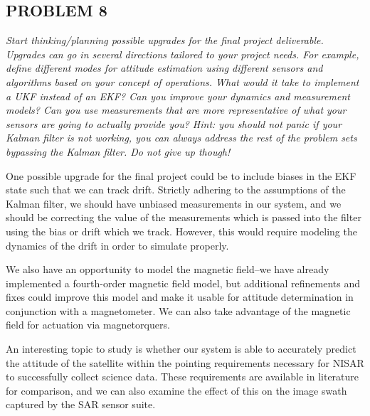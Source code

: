 \subsection{PROBLEM 8}
\textit{Start thinking/planning possible upgrades for the final project deliverable. Upgrades can go in several directions tailored to your project needs. For example, define different modes for attitude estimation using different sensors and algorithms based on your concept of operations. What would it take to implement a UKF instead of an EKF? Can you improve your dynamics and measurement models? Can you use measurements that are more representative of what your sensors are going to actually provide you? Hint: you should not panic if your Kalman filter is not working, you can always address the rest of the problem sets bypassing the Kalman filter. Do not give up though!}

One possible upgrade for the final project could be to include biases in the EKF state such that we can track drift. Strictly adhering to the assumptions of the Kalman filter, we should have unbiased measurements in our system, and we should be correcting the value of the measurements which is passed into the filter using the bias or drift which we track. However, this would require modeling the dynamics of the drift in order to simulate properly.

We also have an opportunity to model the magnetic field–we have already implemented a fourth-order magnetic field model, but additional refinements and fixes could improve this model and make it usable for attitude determination in conjunction with a magnetometer. We can also take advantage of the magnetic field for actuation via magnetorquers.

An interesting topic to study is whether our system is able to accurately predict the attitude of the satellite within the pointing requirements necessary for NISAR to successfully collect science data. These requirements are available in literature for comparison, and we can also examine the effect of this on the image swath captured by the SAR sensor suite.